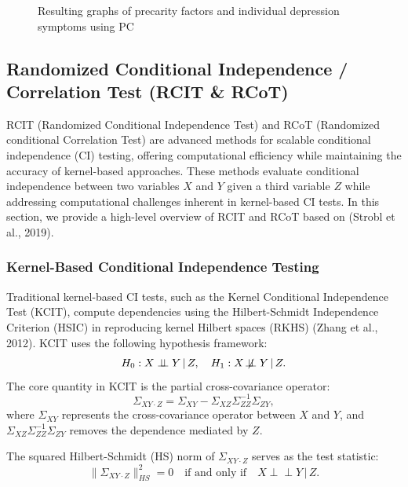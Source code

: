 \documentclass[
]{article}
\begin{document}
\begin{figure}
\begin{minipage}{\linewidth}
{}


\end{minipage}%

\caption{\label{fig-pc_sym}Resulting graphs of precarity factors and
individual depression symptoms using PC}

\end{figure}%

\clearpage

\subsection{Randomized Conditional Independence / Correlation Test (RCIT
\& RCoT)}\label{sec-rcot}

RCIT (Randomized Conditional Independence Test) and RCoT (Randomized
conditional Correlation Test) are advanced methods for scalable
conditional independence (CI) testing, offering computational efficiency
while maintaining the accuracy of kernel-based approaches. These methods
evaluate conditional independence between two variables \(X\) and \(Y\)
given a third variable \(Z\) while addressing computational challenges
inherent in kernel-based CI tests. In this section, we provide a
high-level overview of RCIT and RCoT based on (Strobl et al., 2019).

\subsubsection{Kernel-Based Conditional Independence
Testing}\label{kernel-based-conditional-independence-testing}

Traditional kernel-based CI tests, such as the Kernel Conditional
Independence Test (KCIT), compute dependencies using the Hilbert-Schmidt
Independence Criterion (HSIC) in reproducing kernel Hilbert spaces
(RKHS) (Zhang et al., 2012). KCIT uses the following hypothesis
framework: \[
H_0: X \perp\!\!\!\perp Y \,|\, Z, \quad H_1: X \not\!\perp\!\!\!\perp Y \,|\, Z.
\] The core quantity in KCIT is the partial cross-covariance operator:
\[
\Sigma_{XY \cdot Z} = \Sigma_{XY} - \Sigma_{XZ} \Sigma_{ZZ}^{-1} \Sigma_{ZY},
\] where \(\Sigma_{XY}\) represents the cross-covariance operator
between \(X\) and \(Y\), and
\(\Sigma_{XZ} \Sigma_{ZZ}^{-1} \Sigma_{ZY}\) removes the dependence
mediated by \(Z\).

The squared Hilbert-Schmidt (HS) norm of \(\Sigma_{XY \cdot Z}\) serves
as the test statistic: \[
\|\Sigma_{XY \cdot Z}\|^2_{HS} = 0 \quad \text{if and only if} \quad X \perp\!\!\!\perp Y \,|\, Z.
\]
\end{document}
